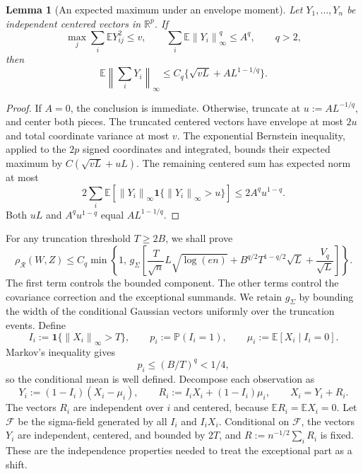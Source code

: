 \documentclass[11pt,letterpaper]{article}
\newenvironment{vSixBlock}{\color{magenta}}{}
\newtheorem{lemma}{Lemma}
\theoremstyle{remark}
\newcommand{\E}{\mathbb E}
\newcommand{\Pp}{\mathbb P}
\newcommand{\R}{\mathbb R}
\newcommand{\norm}[1]{\left\lVert#1\right\rVert}
\newcommand{\rh}{\rho_{\mathcal R}}
\newcommand{\ind}{\mathbf 1}
\begin{document}
\begin{lemma}[An expected maximum under an envelope moment]\label{lem:maximum}
Let \(Y_1,\ldots,Y_n\) be independent centered vectors in \(\R^p\).
If
\[
 \max_j\sum_i\E Y_{ij}^2\le v,\qquad
 \sum_i\E\norm{Y_i}_\infty^q\le A^q,\qquad q>2,
\]
then
\begin{equation}
 \E\norm{\sum_iY_i}_\infty
 \le C_q\{\sqrt{vL}+AL^{1-1/q}\}.
 \label{app:maximal}
\end{equation}
\end{lemma}
\begin{proof}
If \(A=0\), the conclusion is immediate. Otherwise, truncate at
\(u:=AL^{-1/q}\), and center both pieces. The truncated centered
vectors have envelope at most \(2u\) and total coordinate variance at
most \(v\). The exponential Bernstein inequality, applied to the
\(2p\) signed coordinates and integrated, bounds their expected maximum
by \(C(\sqrt{vL}+uL)\). The remaining centered sum has expected norm
at most
\[
 2\sum_i\E[\norm{Y_i}_\infty\ind\{\norm{Y_i}_\infty>u\}]
 \le2A^qu^{1-q}.
\]
Both \(uL\) and \(A^qu^{1-q}\) equal \(AL^{1-1/q}\).
\end{proof}

\begin{vSixBlock}
For any truncation threshold \(T\ge2B\), we shall prove
\begin{equation}
 \rh(W,Z)\le C_q\min\left\{1,\,
 g_\Sigma\left[
 \frac{T}{\sqrt n}L\sqrt{\log(en)}
 +B^{q/2}T^{1-q/2}\sqrt L+\frac{V_q}{\sqrt L}\right]\right\}.
 \label{poly:threshold}
\end{equation}
The first term controls the bounded component. The other terms
control the covariance correction and the exceptional summands.
We retain \(g_\Sigma\) by bounding the width of the conditional
Gaussian vectors uniformly over the truncation events.
\end{vSixBlock}
Define
\[
 I_i:=\ind\{\norm{X_i}_\infty>T\},\qquad
 p_i:=\Pp(I_i=1),\qquad \mu_i:=\E[X_i\mid I_i=0].
\]
Markov's inequality gives 
{
\begin{equation}
p_i\le(B/T)^q<1/4, 
\label{app:p_i-bound}
\end{equation}
}
so the conditional
mean is well defined. Decompose each observation as
\begin{equation}
 Y_i:=(1-I_i)(X_i-\mu_i),\qquad
 R_i:=I_iX_i+(1-I_i)\mu_i,\qquad X_i=Y_i+R_i.
 \label{app:decomposition}
\end{equation}
The vectors \(R_i\) are {independent over \(i\)} and centered, because
\(\E R_i=\E X_i=0\). Let \(\mathcal F\) be the sigma-field generated
by all \(I_i\) and \(I_iX_i\). Conditional on \(\mathcal F\), the
vectors \(Y_i\) are independent, centered, and bounded by \(2T\),
and \(R:=n^{-1/2}\sum_iR_i\) is fixed. These are the independence
properties needed to treat the exceptional part as a shift.
\end{document}
